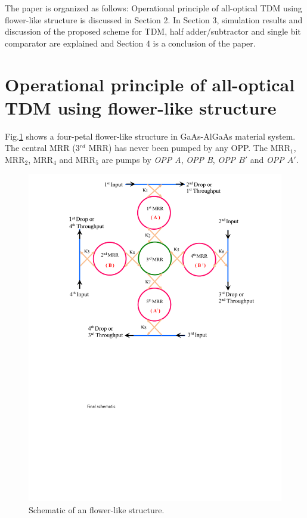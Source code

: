 \documentclass{osa-article}
\begin{document}
The paper is organized as follows: Operational principle of all-optical TDM using flower-like structure is discussed in Section 2. In Section 3, simulation results and discussion of the proposed scheme for TDM, half adder/subtractor and single bit comparator are explained and Section 4 is a conclusion of the paper.

\section{ Operational principle of all-optical TDM using flower-like structure}
\label{} 
Fig.\ref{fig1_flower} shows a four-petal flower-like structure in GaAs-AlGaAs material system. The central MRR (3$^{rd}$ MRR) has never been pumped by any OPP. The MRR$_1$, MRR$_2$, MRR$_4$ and MRR$_5$ are pumps by \textit{OPP A}, \textit{OPP B}, \textit{OPP $B'$} and \textit{OPP $A'$}.
\begin{figure}[tb]
\centering
	\includegraphics[width=4 in]{figs/fig1_flower.pdf}
	\caption{Schematic of an flower-like structure.}
	\label{fig1_flower}
\end{figure}
\end{document}
